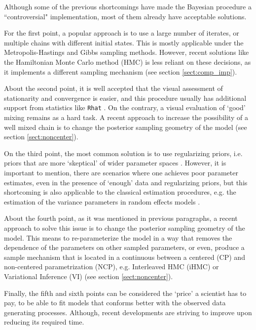 Although some of the previous shortcomings have made the Bayesian procedure a ``controversial" implementation, most of them already have acceptable solutions. 

For the first point, a popular approach is to use a large number of iterates, or multiple chains with different initial states. This is mostly applicable under the Metropolis-Hastings and Gibbs sampling methods. However, recent solutions like the Hamiltonian Monte Carlo method (HMC) \cite{Betancourt_et_al_2013} is less reliant on these decisions, as it implements a different sampling mechanism (see section \ref{sect:comp_imp}). 

About the second point, it is well accepted that the visual assessment of stationarity and convergence is easier, and this procedure usually has additional support from statistics like \texttt{Rhat} \cite{Gelman_et_al_2014}. On the contrary, a visual evaluation of `good' mixing remains as a hard task. A recent approach to increase the possibility of a well mixed chain is to change the posterior sampling geometry of the model \cite{Papaspiliopoulos_et_al_2003, Papaspiliopoulos_et_al_2007, Betancourt_et_al_2013, McElreath_2020} (see section \ref{sect:noncenter}).

On the third point, the most common solution is to use regularizing priors, i.e. priors that are more `skeptical' of wider parameter spaces \cite{McElreath_2020}. However, it is important to mention, there are scenarios where one achieves poor parameter estimates, even in the presence of `enough' data and regularizing priors, but this shortcoming is also applicable to the classical estimation procedures, e.g. the estimation of the variance parameters in random effects models \cite{Skrondal_et_al_2004a}.

About the fourth point, as it was mentioned in previous paragraphs, a recent approach to solve this issue is to change the posterior sampling geometry of the model. This means to re-parameterize the model in a way that removes the dependence of the parameters on other sampled parameters, or even, produce a sample mechanism that is located in a continuous between a centered (CP) and non-centered parametrization (NCP), e.g. Interleaved HMC (iHMC) or Variational Inference (VI) \cite{Gelfand_et_al_1995, Gelfand_et_al_1996, Papaspiliopoulos_et_al_2003, Papaspiliopoulos_et_al_2007, Betancourt_et_al_2013, Gorinova_et_al_2019} (see section \ref{sect:noncenter}).

Finally, the fifth and sixth points can be considered the `price' a scientist has to pay, to be able to fit models that conforms better with the observed data generating processes. Although, recent developments are striving to improve upon reducing its required time.

